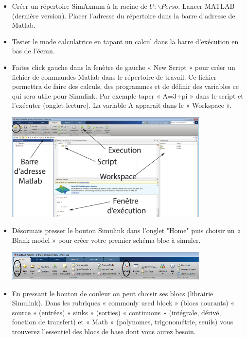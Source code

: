 \begin{itemize}
\item Créer un répertoire SimAxnum à la racine de $U:\backslash Perso$. Lancer MATLAB (dernière version). Placer l'adresse du répertoire dans la barre d'adresse de Matlab. 
\item Tester le mode calculatrice en tapant un calcul dans la barre d'exécution en bas de l'écran. 
\item Faites click gauche dans la fenètre de gauche « New Script » pour créer un fichier de commandes Matlab dans le répertoire de travail. Ce fichier permettra de faire des calculs, des programmes et de définir des variables ce qui sera utile pour Simulink. Par exemple taper « A=3+pi » dans le script et l'exécuter (onglet lecture). La variable A apparait dans le « Workspace ». 
\begin{center}
\includegraphics[width=0.8\textwidth]{images/matlab1.pdf}
\end{center}

\item Désormais presser le bouton Simulink dans l'onglet "Home" puis choisir un « Blank model » pour créer votre premier schéma bloc à simuler. 

\begin{center}
\includegraphics[width=0.8\textwidth]{images/matlab_simulink.png}
\end{center}

\item En pressant le bouton de couleur on peut choisir ses blocs (librairie Simulink). Dans les rubriques « commonly used block » (blocs courants) « source » (entrées) « sinks » (sorties) « continuous » (intégrale, dérivé, fonction de transfert) et « Math » (polynomes, trigonométrie, seuils) vous trouverez l'essentiel des blocs de base dont vous aurez besoin.


\end{itemize}

